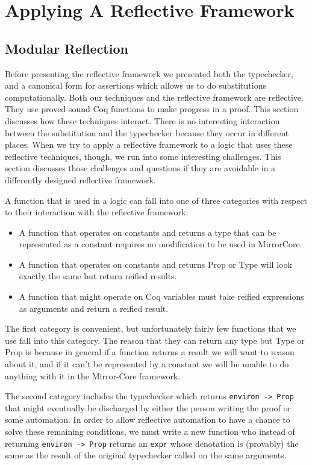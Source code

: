 \documentclass{puthesis}
\begin{document}
\chapter{Applying A Reflective Framework}

\section{Modular Reflection}

Before presenting the reflective framework we presented both the
typechecker, and a canonical form for assertions which allows us to do
substitutions computationally.  Both our techniques and the reflective
framework are reflective.  They use proved-sound Coq functions to make
progress in a proof. This section discusses how these techniques
interact. There is no interesting interaction between the substitution
and the typechecker because they occur in different places. When we
try to apply a reflective framework to a logic that uses these
reflective techniques, though, we run into some interesting
challenges. This section discusses those challenges and questions if
they are avoidable in a differently designed reflective framework.

A function that is used in a logic can fall into one of three
categories with respect to their interaction with the reflective
framework:

\begin{itemize}
  \item A function that operates on constants and returns a type that can be represented as a constant
    requires no modification to be used in MirrorCore.
  \item A function that operates on constants and returns Prop or Type will look exactly
    the same but return reified results.
  \item A function that might operate on Coq variables must take reified expressions as 
    arguments and return a reified result.
\end{itemize}

The first category is convenient, but unfortunately fairly few functions that
we use fall into this category. The reason that they can return any
type but Type or Prop is because in general if a function returns a result we
will want to reason about it, and if it can't be represented by a constant
we will be unable to do anything with it in the Mirror-Core framework.

The second category includes the typechecker which returns
\lstinline|environ -> Prop| that might eventually be discharged
by either the person writing the proof or some automation. 
In order to allow reflective automation to have a chance to solve these remaining
conditions, we must write a new function who instead of returning
\lstinline|environ -> Prop| returns an \lstinline|expr| whose denotation
is (provably) the same as the result of the original typechecker called
on the same arguments.
\end{document}
